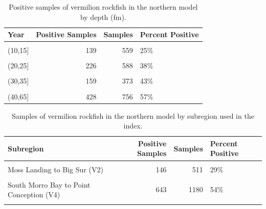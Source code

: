 \documentclass[11pt,
  english,
]{article}
\begin{document}
\begin{table}

\caption{\label{tab:tab-depth-cpfvonboard}Positive samples of vermilion rockfish in the northern model by depth (fm).}
\centering
\begin{tabular}[t]{lrrl}
\toprule
Year & Positive Samples & Samples & Percent Positive\\
\midrule
\cellcolor{gray!6}{(0,10]} & \cellcolor{gray!6}{40} & \cellcolor{gray!6}{346} & \cellcolor{gray!6}{12\%}\\
(10,15] & 139 & 559 & 25\%\\
\cellcolor{gray!6}{(15,20]} & \cellcolor{gray!6}{279} & \cellcolor{gray!6}{808} & \cellcolor{gray!6}{35\%}\\
(20,25] & 226 & 588 & 38\%\\
\cellcolor{gray!6}{(25,30]} & \cellcolor{gray!6}{219} & \cellcolor{gray!6}{601} & \cellcolor{gray!6}{36\%}\\
\addlinespace
(30,35] & 159 & 373 & 43\%\\
\cellcolor{gray!6}{(35,40]} & \cellcolor{gray!6}{216} & \cellcolor{gray!6}{450} & \cellcolor{gray!6}{48\%}\\
(40,65] & 428 & 756 & 57\%\\
\bottomrule
\end{tabular}
\end{table}

\FloatBarrier

\begin{table}

\caption{\label{tab:tab-region-cpfvonboard}Samples of vermilion rockfish in the northern model by subregion used in the index.}
\centering
\begin{tabular}[t]{lrrl}
\toprule
Subregion & Positive Samples & Samples & Percent Positive\\
\midrule
\cellcolor{gray!6}{CA/OR border to Santa Cruz (V1)} & \cellcolor{gray!6}{238} & \cellcolor{gray!6}{1213} & \cellcolor{gray!6}{20\%}\\
Moss Landing to Big Sur (V2) & 146 & 511 & 29\%\\
\cellcolor{gray!6}{San Luis Obsipso to Morro Bay (V3)} & \cellcolor{gray!6}{591} & \cellcolor{gray!6}{1044} & \cellcolor{gray!6}{57\%}\\
South Morro Bay to Point Conception (V4) & 643 & 1180 & 54\%\\
\cellcolor{gray!6}{Offshore (V5)} & \cellcolor{gray!6}{88} & \cellcolor{gray!6}{533} & \cellcolor{gray!6}{17\%}\\
\bottomrule
\end{tabular}
\end{table}
\end{document}
